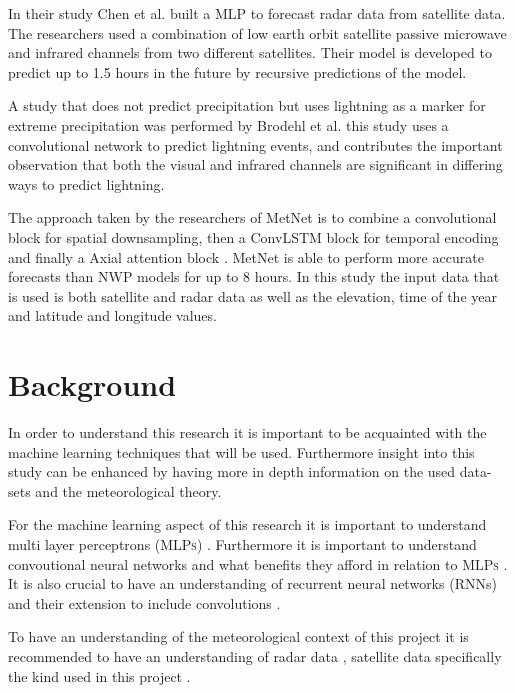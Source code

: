 \documentclass[acmtog, authorversion]{acmart}
\begin{document}
In their study Chen et al. built a \cite{precipitationEstimationFromSat} MLP to forecast radar data from satellite data. The researchers used a combination of low earth orbit satellite passive microwave and infrared channels from two different satellites. Their model is developed to predict up to 1.5 hours in the future by recursive predictions of the model.
\medskip

A study that does not predict precipitation but uses lightning as a marker for extreme precipitation was performed by Brodehl et al. \cite{predictionLightning} this study uses a convolutional network to predict lightning events, and contributes the important observation that both the visual and infrared channels are significant in differing ways to predict lightning.
\medskip

The approach taken by the researchers of MetNet \cite{sønderby2020metnet} is to combine a convolutional block for spatial downsampling, then a ConvLSTM block for temporal encoding and finally a Axial attention block \cite{vaswani2017attention}. MetNet is able to perform more accurate forecasts than NWP models for up to 8 hours. In this study the input data that is used is both satellite and radar data as well as the elevation, time of the year and latitude and longitude values.

\section{Background}
In order to understand this research it is important to be acquainted with the machine learning techniques that will be used. Furthermore insight into this study can be enhanced by having more in depth information on the used data-sets and the meteorological theory.
\medskip

For the machine learning aspect of this research it is important to understand multi layer perceptrons (\textsc{MLPs}) \cite{schmidhuber2022annotated}. Furthermore it is important to understand convoutional neural networks and what benefits they afford in relation to \textsc{MLPs} \cite{oshea2015introduction}. It is also crucial to have an understanding of recurrent neural networks (RNNs) and their extension to include convolutions \cite{convlstm}.
\medskip

To have an understanding of the meteorological context of this project it is recommended to have an understanding of radar data \cite{rinehart1991radar}, satellite data specifically the kind used in this project \cite{schmid-no-date}.
\end{document}
